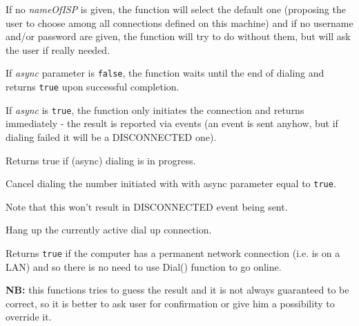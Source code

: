 If no {\it nameOfISP} is given, the function will select the default one
(proposing the user to choose among all connections defined on this machine)
and if no username and/or password are given, the function will try to do
without them, but will ask the user if really needed.

If {\it async} parameter is {\tt false}, the function waits until the end of dialing
and returns {\tt true} upon successful completion.

If {\it async} is {\tt true}, the function only initiates the connection and
returns immediately - the result is reported via events (an event is sent
anyhow, but if dialing failed it will be a DISCONNECTED one).

\label{wxdialupmanagerisdialing}


Returns true if (async) dialing is in progress.



\label{wxdialupmanagercanceldialing}


Cancel dialing the number initiated with  
with async parameter equal to {\tt true}.

Note that this won't result in DISCONNECTED event being sent.



\label{wxdialupmanagerhangup}


Hang up the currently active dial up connection.

\label{wxdialupmanagerisalwaysonline}


Returns {\tt true} if the computer has a permanent network connection (i.e. is
on a LAN) and so there is no need to use Dial() function to go online.

{\bf NB:} this functions tries to guess the result and it is not always
guaranteed to be correct, so it is better to ask user for
confirmation or give him a possibility to override it.

